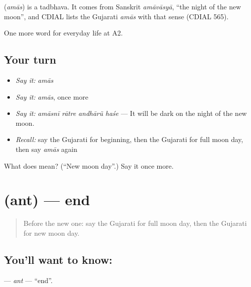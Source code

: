 \begin{cousinweb}
\textbf{} (\emph{amās}) is a tadbhava. It comes from Sanskrit \emph{amāvāsyā}, \textquotedblleft{}the night of the new moon\textquotedblright{}, and CDIAL lists the Gujarati \emph{amās} with that sense (CDIAL 565).
\end{cousinweb}

\begin{grammarlens}[title={What you've built}]
One more word for everyday life at A2.
\end{grammarlens}

\subsection*{Your turn}
\begin{itemize}
\raggedright
  \item \emph{Say it:} \emph{amās}
  \item \emph{Say it:} \emph{amās}, once more
  \item \emph{Say it:} \emph{amāsnī rātre andhārũ haśe} — It will be dark on the night of the new moon.
  \item \emph{Recall:} say the Gujarati for beginning, then the Gujarati for full moon day, then say \emph{amās} again
\end{itemize}

\begin{tcolorbox}[breakable,colback=teal!4,colframe=teal!35!black,title={Before you move on}]
What does  mean? (\textquotedblleft{}New moon day\textquotedblright{}.) Say it once more.
\end{tcolorbox}
\section[\texorpdfstring{\gu{અંત} (ant)}{અંત (ant)}]{ (ant) — end}

\label{lesson:GU-C175-ant}



\begin{quote}
Before the new one: say the Gujarati for full moon day, then the Gujarati for new moon day.
\end{quote}

\subsection*{You'll want to know: }
\textbf{} — \emph{ant} — \textquotedblleft{}end\textquotedblright{}.

